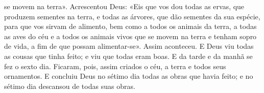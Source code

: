 \begin{paracol}{2}
{se movem na terra». Acrescentou Deus: «Eis que vos dou todas as ervas, que produzem sementes na terra, e todas as árvores, que dão sementes da sua espécie, para que vos sirvam de alimento, bem como a todos os animais da terra, a todas as aves do céu e a todos os animais vivos que se movem na terra e tenham sopro de vida, a fim de que possam alimentar-se». Assim aconteceu. E Deus viu todas as cousas que tinha feito; e viu que todas eram boas. E da tarde e da manhã se fez o sexto dia. Ficaram, pois, assim criados o céu, a terra e todos seus ornamentos. E concluiu Deus no sétimo dia todas as obras que havia feito; e no sétimo dia descansou de todas suas obras.
}\switchcolumn*{}\switchcolumn{}\switchcolumn*{}\switchcolumn{}\switchcolumn*{}\switchcolumn{}\switchcolumn*{}\switchcolumn{}\end{paracol}

